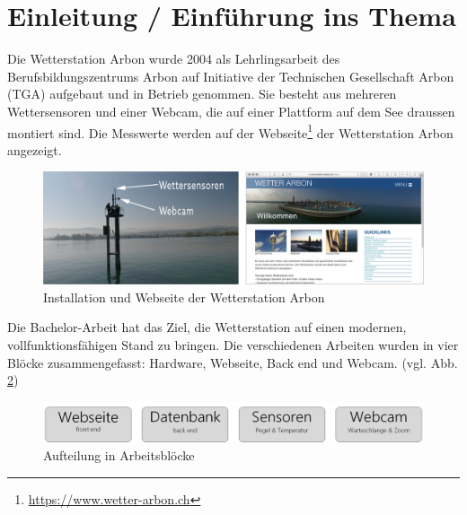 \section*{Einleitung / Einführung ins Thema}
\newline
{}\newline
{}\newline

Die Wetterstation Arbon wurde 2004 als Lehrlingsarbeit des Berufsbildungszentrums Arbon auf Initiative der Technischen Gesellschaft Arbon (TGA) aufgebaut und in Betrieb genommen. Sie besteht aus mehreren Wettersensoren und einer Webcam, die auf einer Plattform auf dem See draussen montiert sind. Die Messwerte werden auf der Webseite\footnote{ \url{https://www.wetter-arbon.ch}}  der Wetterstation Arbon angezeigt.

\begin{figure}[h!]
	\centering
	\includegraphics[width=1\linewidth]{img/kombi}
	\caption{Installation und Webseite der Wetterstation Arbon}
	\label{img:wetterstation}
\end{figure}

Die Bachelor-Arbeit hat das Ziel, die Wetterstation auf einen modernen, vollfunktionsfähigen Stand zu bringen. Die verschiedenen Arbeiten wurden in vier Blöcke zusammengefasst: Hardware, Webseite, Back end und Webcam. (vgl. Abb. \ref{img:module})

\vspace{5mm} %

\begin{figure}[h!]
	\centering
	\includegraphics[width=0.8\linewidth]{img/module}
	\caption{Aufteilung in Arbeitsblöcke}
	\label{img:module}
\end{figure}


\newpage
